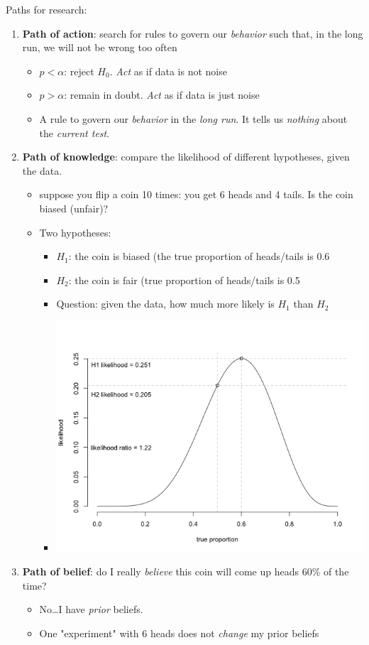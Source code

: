 \documentclass[11pt]{article}
\begin{document}
Paths for research:
\begin{enumerate}
\item \textbf{Path of action}: search for rules to govern our \emph{behavior} such that, in the long run, we will not be wrong too often
\begin{itemize}
\item $p < \alpha$: reject $H_0$.  \emph{Act} as if data is not noise
\item $p > \alpha$: remain in doubt. \emph{Act} as if data is just noise
\item A rule to govern our \emph{behavior} in the \emph{long run}.  It tells us \emph{nothing} about the \emph{current test}.
\end{itemize}

\item \textbf{Path of knowledge}:  compare the likelihood of different hypotheses, given the data.
\begin{itemize}
\item suppose you flip a coin 10 times: you get 6 heads and 4 tails.  Is the coin biased (unfair)?
\item Two hypotheses: 
\begin{itemize}
\item $H_1$: the coin is biased (the true proportion of heads/tails is 0.6
\item $H_2$: the coin is fair (true proportion of heads/tails is 0.5
\item Question: given the data, how much more likely is $H_1$ than $H_2$
\item \includegraphics[width=.9\linewidth]{figures/coinFlip.png}
\end{itemize}
\end{itemize}

\item \textbf{Path of belief}: do I really \emph{believe} this coin will come up heads 60\% of the time?
\begin{itemize}
\item No\ldots{}I have \emph{prior} beliefs.
\item One "experiment" with 6 heads does not \emph{change} my prior beliefs
\end{itemize}
\end{enumerate}
\end{document}
